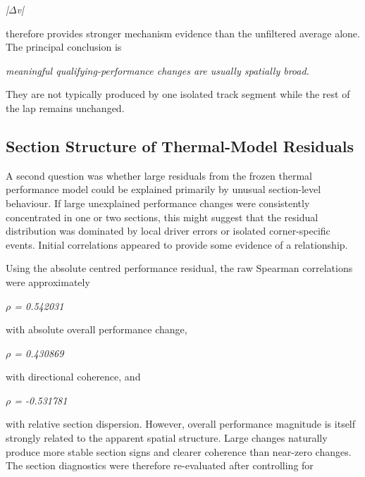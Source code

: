 \begin{center}\textit{|\ensuremath{\Delta}v|}\end{center}

therefore provides stronger mechanism evidence than the unfiltered average alone. The principal conclusion is

\begin{center}\textit{meaningful qualifying-performance changes are usually spatially broad.}\end{center}

They are not typically produced by one isolated track segment while the rest of the lap remains unchanged.

\subsection{Section Structure of Thermal-Model Residuals}
A second question was whether large residuals from the frozen thermal performance model could be explained primarily by unusual section-level behaviour. If large unexplained performance changes were consistently concentrated in one or two sections, this might suggest that the residual distribution was dominated by local driver errors or isolated corner-specific events. Initial correlations appeared to provide some evidence of a relationship.

Using the absolute centred performance residual, the raw Spearman correlations were approximately

\begin{center}\textit{\ensuremath{\rho} = 0.542031}\end{center}

with absolute overall performance change,

\begin{center}\textit{\ensuremath{\rho} = 0.430869}\end{center}

with directional coherence, and

\begin{center}\textit{\ensuremath{\rho} = -0.531781}\end{center}

with relative section dispersion. However, overall performance magnitude is itself strongly related to the apparent spatial structure. Large changes naturally produce more stable section signs and clearer coherence than near-zero changes. The section diagnostics were therefore re-evaluated after controlling for

